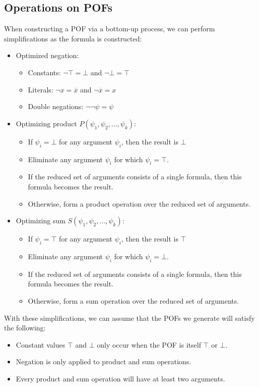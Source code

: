 \documentclass[letterpaper,USenglish,cleveref, autoref, thm-restate]{lipics-v2021}
\newcommand{\tautology}{\top}
\newcommand{\nil}{\bot}
\newcommand{\obar}[1]{\overline{#1}}
\begin{document}
\subsection{Operations on POFs}

When constructing a POF via a bottom-up process, we can perform simplifications as the formula is constructed:
\begin{itemize}
\item
Optimized negation:
\begin{itemize}
\item Constants: $\neg \tautology = \nil$ and $\neg \nil = \tautology$
\item Literals: $\neg x = \obar{x}$ and $\neg \obar{x} = x$
\item Double negations: $\neg \neg \psi = \psi$
\end{itemize}

\item 
Optimizing
product $P(\psi_1, \psi_2, \ldots, \psi_k)$:
\begin{itemize}
\item If $\psi_i = \nil$ for any argument $\psi_i$, then the result is $\nil$
\item Eliminate any argument $\psi_i$ for which $\psi_i = \tautology$.
\item If the reduced set of arguments consists of a single formula, then this formula becomes the result.
\item Otherwise, form a product operation over the reduced set of arguments.
\end{itemize}

\item
Optimizing sum $S(\psi_1, \psi_2, \ldots, \psi_k)$:
\begin{itemize}
\item If $\psi_i = \tautology$ for any argument $\psi_i$, then the result is $\tautology$
\item Eliminate any argument $\psi_i$ for which $\psi_i = \nil$.
\item If the reduced set of arguments consists of a single formula, then this formula becomes the result.
\item Otherwise, form a sum operation over the reduced set of arguments.
\end{itemize}
\end{itemize}

With these simplifications, we can assume that the POFs we generate will satisfy the following:
\begin{itemize}
\item Constant values $\tautology$ and $\nil$ only occur when the POF is itself
  $\tautology$ or $\nil$.
\item Negation is only applied to product and sum operations.
\item Every product and sum operation will have at least two arguments.
\end{itemize}
\end{document}
